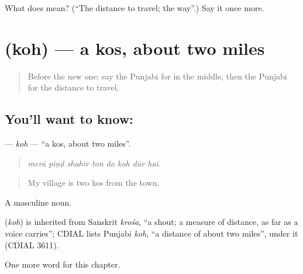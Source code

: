 \begin{tcolorbox}[breakable,colback=teal!4,colframe=teal!35!black,title={Before you move on}]
What does  mean? (\textquotedblleft{}The distance to travel; the way\textquotedblright{}.) Say it once more.
\end{tcolorbox}
\section[\texorpdfstring{\pa{ਕੋਹ} (koh)}{ਕੋਹ (koh)}]{ (koh) — a kos, about two miles}

\label{lesson:PA-C265-koh}



\begin{quote}
Before the new one: say the Punjabi for in the middle, then the Punjabi for the distance to travel.
\end{quote}

\subsection*{You'll want to know: }
\textbf{} — \emph{koh} — \textquotedblleft{}a kos, about two miles\textquotedblright{}.

\begin{quote}
       
\end{quote}

\begin{quote}
\emph{merā piṇḍ shahir ton do koh dūr hai.}
\end{quote}

\begin{quote}
My village is two kos from the town.
\end{quote}

A masculine noun.

\begin{cousinweb}
\textbf{} (\emph{koh}) is inherited from Sanskrit \emph{krośa}, \textquotedblleft{}a shout; a measure of distance, as far as a voice carries\textquotedblright{}; CDIAL lists Punjabi \emph{koh}, \textquotedblleft{}a distance of about two miles\textquotedblright{}, under it (CDIAL 3611).
\end{cousinweb}

\begin{grammarlens}[title={What you've built}]
One more word for this chapter.
\end{grammarlens}

